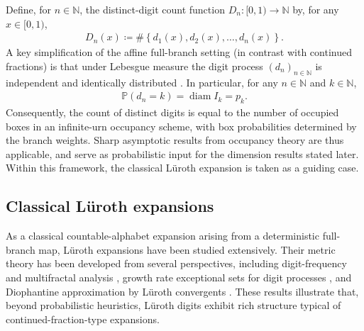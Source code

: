 \documentclass[12pt,reqno]{amsart}
\theoremstyle{definition}
\theoremstyle{plain}
\begin{document}
Define, for $n\in\mathbb{N}$, the distinct-digit count function $D_n:[0,1)\to\mathbb{N}$ by, for any $x\in[0,1)$, 
\begin{align*}
    D_n(x)\coloneqq \#{\left\{d_1(x),d_2(x),\ldots,d_n(x)\right\}}.
\end{align*}
A key simplification of the affine full-branch setting (in contrast with continued fractions) is that under Lebesgue measure the digit process $(d_n)_{n\in\mathbb N}$ is independent and identically distributed \cite{DajaniKraaikamp1996ApproximationLuroth,JagerDeVroedt1969LurothErgodic}. In particular, for any $n\in\mathbb{N}$ and $k\in\mathbb{N}$,
\begin{align*}
    \mathbb{P}(d_n=k)=\operatorname{diam}{I_k}=p_k.
\end{align*}
Consequently, the count of distinct digits is equal to the number of occupied boxes in an infinite-urn occupancy scheme, with box probabilities determined by the branch weights. Sharp asymptotic results from occupancy theory are thus applicable, and serve as probabilistic input for the dimension results stated later. Within this framework, the classical L\"uroth expansion is taken as a guiding case.

\subsection{Classical L\"uroth expansions}

As a classical countable-alphabet expansion arising from a deterministic full-branch map, L\"uroth expansions have been studied extensively. Their metric theory has been developed from several perspectives, including digit-frequency and multifractal analysis \cite{Barbour2009UnivariateApproximations,Feng2023DimensionTO}, growth rate exceptional sets for digit processes \cite{FengTanZhou2021ExactDimensions,LinLiLou2022LargestDigits,TanZhang2020RelativeGrowth}, and Diophantine approximation by L\"uroth convergents \cite{CaoWuZhang2013Efficiency,HuangKalle2024GeneralisedAlphaLuroth,Lee2025LurothDA,TanZhou2021ApproximationProperties}. These results illustrate that, beyond probabilistic heuristics, L\"uroth digits exhibit rich structure typical of continued-fraction-type expansions.
\end{document}
